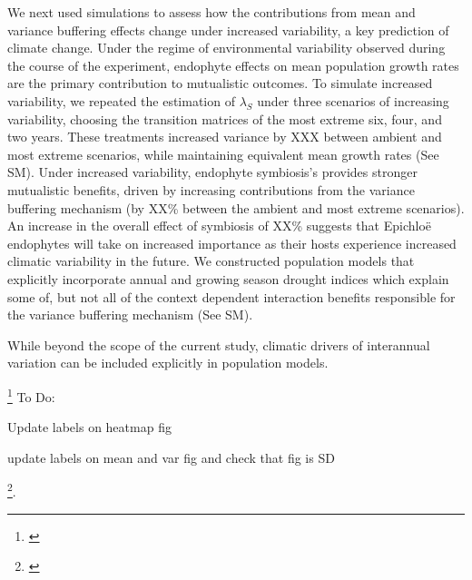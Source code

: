 \documentclass[12pt]{article}
\newcommand{\tom}[2]{{\color{red}{#1}}\footnote{\textit{\color{red}{#2}}}}
\newcommand{\josh}[2]{{\color{blue}{#1}}\footnote{\textit{\color{blue}{#2}}}}
\begin{document}
We next used simulations to assess how the contributions from mean and variance buffering effects change  under increased variability, a key prediction of climate change.
Under the regime of environmental variability observed during the course of the experiment, endophyte effects on mean population growth rates are the primary contribution to mutualistic outcomes. 
To simulate increased variability, we repeated the estimation of $\lambda_{S}$ under three scenarios of increasing variability, choosing the transition matrices of the most extreme six, four, and two years. 
These treatments increased variance by XXX between ambient and most extreme scenarios, while maintaining equivalent mean growth rates (See SM).
Under increased variability, endophyte symbiosis's provides stronger mutualistic benefits, driven by increasing contributions from the variance buffering mechanism (by XX\% between the ambient and most extreme scenarios).
An increase in the overall effect of symbiosis of XX\% suggests that Epichlo\"{e} endophytes will take on increased importance as their hosts experience increased climatic variability in the future. 
We constructed population models that explicitly incorporate annual and growing season drought indices which explain some of, but not all of the context dependent interaction benefits responsible for the variance buffering mechanism (See SM).

While beyond the scope of the current study, climatic drivers of interannual variation can be included explicitly in population models. 



 \josh{start}{}
 To Do:
 
 Update labels on heatmap fig
 
 update labels on mean and var fig and check that fig is SD
 
 
 \josh{\cite{rees2009integral}}{I don't know if there's a better citation for this, this is more about IPM's-- Tom: I don't think we need a citation here, but we should briefly describe how we did this, since readers will get here before the methods. I've tried to add a little of this throughout the Results.}. 
 
 
 
\end{document}
